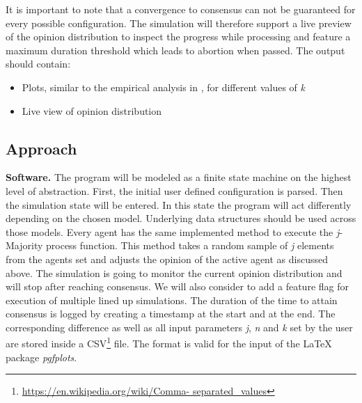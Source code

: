 \documentclass{thesis}
\begin{document}
It is important to note that a convergence to consensus can not be guaranteed
for every possible configuration. The simulation will therefore support a live
preview of the opinion distribution to inspect the progress while processing
and feature a maximum duration threshold which leads to abortion when passed.
\newline
The output should contain:

\begin{itemize}
\item Plots, similar to the empirical analysis in \cite{1}, for different values
of \textit{k}
\item Live view of opinion distribution
\end{itemize}

\subsection{Approach}
\textbf{Software.} The program will be modeled as a finite state machine on
the highest level of abstraction. First, the initial user defined configuration
is parsed. Then the simulation state will be entered. In this state the program
will act differently depending on the chosen model. Underlying data structures
should be used across those models. Every agent has the same implemented method
to execute the \textit{j}-Majority process function. This method takes a random
sample of \textit{j} elements from the agents set and adjusts the opinion of
the active agent as discussed above. The simulation is going to monitor the
current opinion distribution and will stop after reaching consensus. We will also
consider to add a feature flag for execution of multiple lined up simulations.
\newline
The duration of the time to attain consensus is logged by creating a timestamp
at the start and at the end. The corresponding difference as well as all
input parameters \textit{j}, \textit{n} and \textit{k} set by the user
are stored inside a CSV\footnote{\url{https://en.wikipedia.org/wiki/Comma-
separated\_values}} file. The format is valid for the input of the \LaTeX
package \textit{pgfplots}.
\end{document}

